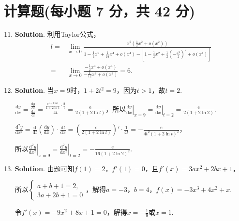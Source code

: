 \documentclass[../Main.tex]{subfiles}
\begin{document}
\section{计算题(每小题 7 分，共 42 分)}
\begin{enumerate}
    \setcounter{enumi}{10}
    \item \textbf{Solution}. 利用Taylor公式，
          \[
              \begin{aligned}
                  l= & \lim_{x\to0}\frac{x^2\left(\frac{1}{2}x^2+o(x^2)\right)}{1-\frac{1}{2}x^2+\frac{1}{24}x^4+o(x^4)-\left[1-\frac{1}{2}x^2+\frac{1}{2}\left(-\frac{x^2}{2}\right)^2+o(x^4)\right]} \\
                  =  & \lim_{x\to0}\frac{-\frac{1}{2}x^4+o(x^4)}{-\frac{1}{12}x^4+o(x^4)}=6.
              \end{aligned}
          \]

    \item \textbf{Solution}. 当$x=9$时，$1+2t^{2}=9$，因为$t>1$，故$t=2$.

          $\frac{\mathrm{d}y}{\mathrm{d}x}=\frac{\frac{\mathrm{d}y}{\mathrm{d}t}}{\frac{\mathrm{d}x}{\mathrm{d}t}}
              =\frac{\frac{\mathrm{e}^{1+2\ln t}}{1+2\ln t}\cdot\frac{2}{t}}{4t}=\frac{\mathrm{e}}{2(1+2\ln
                  t)}$，所以$\left.\frac{\mathrm{d}y}{\mathrm{d}x}\right|_{x=9}=\left.\frac{\mathrm{d}y}{\mathrm{d}x}
              \right|_{t=2}=\frac{\mathrm{e}}{2(1+2\ln 2)}$.

          $\frac{\mathrm{d}^{2}y}{\mathrm{d}x^{2}}=\frac{\mathrm{d}}{\mathrm{d}t}\left
              (\frac{\mathrm{d}y}{\mathrm{d}x}\right)\cdot\frac{\mathrm{d}t}{\mathrm{d}x}
              =\left(\frac{\mathrm{e}}{2(1+2\ln t)}\right)'\cdot\frac{1}{4t}=-\frac{\mathrm{e}}{4t^{2}(1+2\ln
                      t)^{2}}$，

          所以$\left.\frac{\mathrm{d}^{2}y}{\mathrm{d}x^{2}}\right|_{x=9}=\left.\frac{\mathrm{d}^{2}y}{\mathrm{d}x^{2}}
              \right|_{t=2}=-\frac{\mathrm{e}}{16(1+2\ln 2)^{2}}$.

    \item \textbf{Solution}. 由题可知$f(1)=2$，$f'(1)=0$，且$f'(x)=3ax^{2}+2
              bx+1$，

          所以$\begin{cases}
                  a+b+1=2, \\
                  3a+2b+1=0
              \end{cases}$，解得$a=-3$，$b=4$，$f(x)=-3x^{3}+4x^{2}+x$.

          令$f'(x)=-9x^{2}+8x+1=0$，解得$x=-\frac{1}{9}$或$x=1$.


\end{enumerate}
\end{document}
